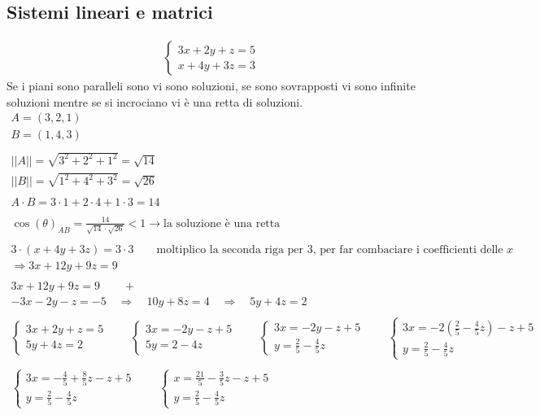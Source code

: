\documentclass[italian]{article}
\begin{document}
\subsection{Sistemi lineari e matrici}
\begin{gather*}
	\begin{cases*}
		3x+2y+z=5\\
		x+4y+3z=3
	\end{cases*}
\end{gather*}
Se i piani sono paralleli sono vi sono soluzioni, se sono sovrapposti vi sono infinite soluzioni mentre se si incrociano vi è una retta di soluzioni.
\begin{gather*}
		A = (3,2,1)\\
		B = (1,4,3)\\\\
		||A|| = \sqrt{3^2 + 2^2 + 1^2} = \sqrt{14}\\
		||B|| = \sqrt{1^2 + 4^2 + 3^2} = \sqrt{26}\\\\
		A\cdot B = 3\cdot 1 + 2\cdot 4 + 1 \cdot 3 = 14\\\\
		\cos (\theta)_{AB} = \frac{14}{\sqrt{14}\cdot \sqrt{26}} < 1 \to \text{la soluzione è una retta}\\\\
		3\cdot(x+4y+3z)=3\cdot 3 \qquad \text{moltiplico la seconda riga per 3, per far combaciare i coefficienti delle $x$}\\
		\Rightarrow 3x + 12y +9z = 9\\\\
		3x+12y+9z=9 \qquad +\\
		-3x - 2y - z = -5 \quad \Rightarrow \quad 10y+8z=4 \quad \Rightarrow \quad 5y+4z=2\\\\
		\begin{cases*}
			3x+2y+z=5\\
			5y+4z=2
		\end{cases*}
		\qquad
		\begin{cases*}
			3x=-2y-z+5\\
			5y=2-4z
		\end{cases*}
		\qquad
		\begin{cases*}
			3x=-2y-z+5\\
			y=\frac{2}{5}-\frac{4}{5}z
		\end{cases*}
		\qquad
		\begin{cases*}
			3x=-2(\frac{2}{5}-\frac{4}{5}z)-z+5\\
			y=\frac{2}{5}-\frac{4}{5}z
		\end{cases*}
		\\\\
		\begin{cases*}
			3x=-\frac{4}{5} + \frac{8}{5}z-z+5\\
			y=\frac{2}{5}-\frac{4}{5}z
		\end{cases*}
		\qquad
		\begin{cases*}
			x=\frac{21}{5} - \frac{3}{5}z-z+5\\
			y=\frac{2}{5}-\frac{4}{5}z
		\end{cases*}
\end{gather*}\\
\end{document}
